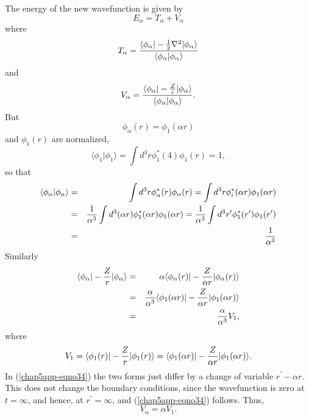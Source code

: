 The energy of the new wavefunction is given by
\begin{equation}
E_{\alpha} = T_{\alpha} + V_{\alpha}
\end{equation}
where
\begin{equation}
T_{\alpha} = {\langle \phi_{\alpha} | - {1 \over 2} \nabla^2 
| \phi_{\alpha} \rangle \over \langle \phi_{\alpha} | \phi_{\alpha} 
\rangle}
\end{equation}
and
\begin{equation}
V_{\alpha} = {\langle \phi_{\alpha} | - {Z \over r} | 
\phi_{\alpha} \rangle \over \langle \phi_{\alpha} | \phi_{\alpha} 
\rangle} .
\end{equation}
But
\begin{equation}
\phi_{\alpha} (r) = \phi_1 ( \alpha r )
\end{equation}
and $\phi_1(r)$ are normalized,
\begin{equation}
\langle \phi_1 | \phi_1 \rangle = \int d^3 r \phi^*_1 (4) \phi_1 (r) = 
1 ,
\end{equation}
so that
\begin{eqnarray}
\langle \phi_{\alpha} | \phi_{\alpha} \rangle &=& \int d^3 r 
\phi^*_{\alpha} (r) \phi_{\alpha} (r) = \int d^3 r \phi^*_i ( \alpha 
r ) \phi_1 ( \alpha r )\cr
&=& {1 \over \alpha^3} \int d^3 ( \alpha r ) \phi^*_1 ( \alpha r ) 
\phi_1 ( \alpha r ) = {1 \over \alpha^3} \int d^3 r^{\prime} \phi^*_1 
(r^{\prime} ) \phi_1 (r^{\prime} )\cr
&=& {1 \over \alpha^3}
\end{eqnarray}
Similarly
\begin{eqnarray}
\langle \phi_{\alpha} | - {Z \over r} | \phi_{\alpha} 
\rangle &=& \alpha \langle \phi_{\alpha} (r) | - {Z \over \alpha 
r} | \phi_{\alpha} (r) \rangle\cr
&=& {\alpha \over \alpha^3} \langle \phi_1 ( \alpha r ) | - {Z 
\over \alpha r} | \phi_1 ( \alpha r ) \rangle \cr
&=& {\alpha \over \alpha^3} V_1 ,
\end{eqnarray}
where
\begin{equation}
V_1 = \langle \phi_1 (r) | - {Z \over r} | \phi_1 (r) 
\rangle = \langle \phi_1 ( \alpha r )  | - {Z \over \alpha r} 
| \phi_1 ( \alpha r ) \rangle .
\label{chap5app-eqno34}
\end{equation}
In (\ref{chap5app-eqno34}) the two forms just differ by a change of variable 
$r^{\prime} - \alpha r$.  This does not change the boundary 
conditions, since the wavefunction is zero at $t = \infty$, and 
hence, at $r^{\prime} = \infty$, and (\ref{chap5app-eqno34}) follows.  Thus,
\begin{equation}
V_{\alpha} = \alpha V_1 .
\label{chap5app-eqno35}
\end{equation}
